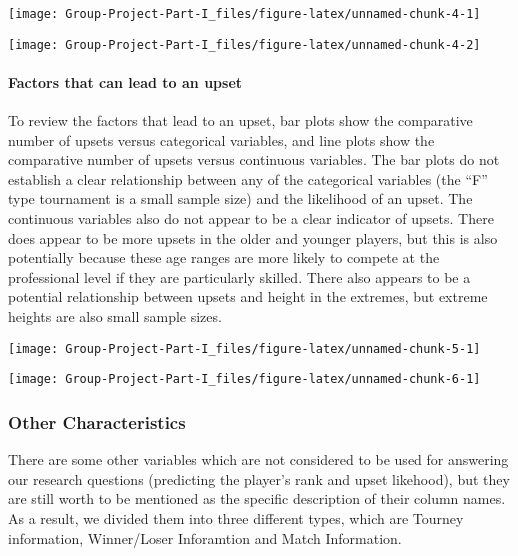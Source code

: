 \documentclass[
]{article}
\begin{document}
\begin{center}\texttt{[image: Group-Project-Part-I\_files/figure-latex/unnamed-chunk-4-1]} \end{center}

\begin{center}\texttt{[image: Group-Project-Part-I\_files/figure-latex/unnamed-chunk-4-2]} \end{center}

\hypertarget{factors-that-can-lead-to-an-upset}{%
\paragraph{Factors that can lead to an
upset}\label{factors-that-can-lead-to-an-upset}}

To review the factors that lead to an upset, bar plots show the
comparative number of upsets versus categorical variables, and line
plots show the comparative number of upsets versus continuous variables.
The bar plots do not establish a clear relationship between any of the
categorical variables (the ``F'' type tournament is a small sample size)
and the likelihood of an upset. The continuous variables also do not
appear to be a clear indicator of upsets. There does appear to be more
upsets in the older and younger players, but this is also potentially
because these age ranges are more likely to compete at the professional
level if they are particularly skilled. There also appears to be a
potential relationship between upsets and height in the extremes, but
extreme heights are also small sample sizes.

\begin{center}\texttt{[image: Group-Project-Part-I\_files/figure-latex/unnamed-chunk-5-1]} \end{center}

\begin{center}\texttt{[image: Group-Project-Part-I\_files/figure-latex/unnamed-chunk-6-1]} \end{center}

\hypertarget{other-characteristics}{%
\subsubsection{Other Characteristics}\label{other-characteristics}}

There are some other variables which are not considered to be used for
answering our research questions (predicting the player's rank and upset
likehood), but they are still worth to be mentioned as the specific
description of their column names. As a result, we divided them into
three different types, which are Tourney information, Winner/Loser
Inforamtion and Match Information.
\end{document}
